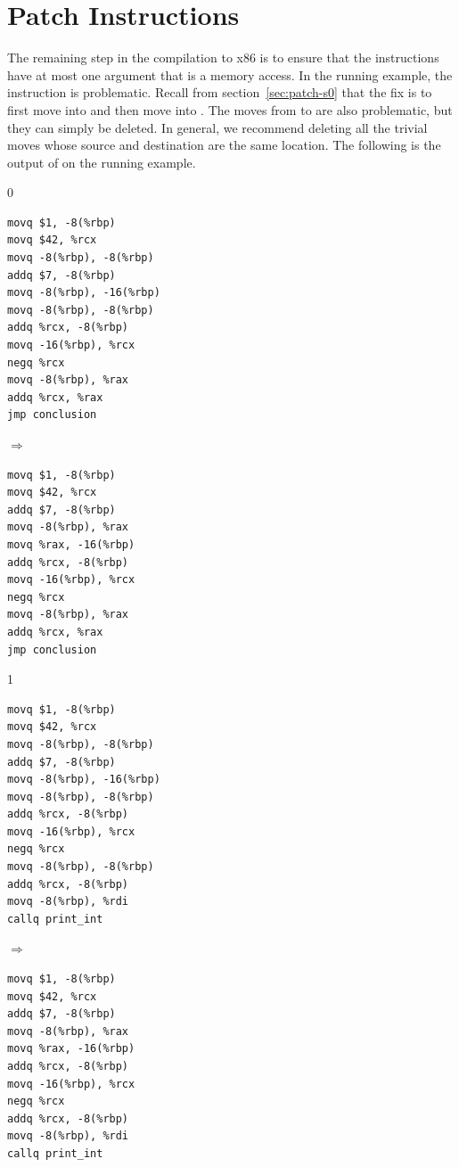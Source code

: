 \documentclass[7x10]{TimesAPriori_MIT}%
\def\racketEd{0}
\def\pythonEd{1}
\def\edition{0}
\numberwithin{theorem}{chapter}
\numberwithin{definition}{chapter}
\numberwithin{equation}{chapter}
\begin{document}
\section{Patch Instructions}
\label{sec:patch-instructions}

The remaining step in the compilation to x86 is to ensure that the
instructions have at most one argument that is a memory access.
%
In the running example, the instruction  is problematic. Recall from section~\ref{sec:patch-s0}
  that the fix is to first move  into  and
  then move  into .
%
The moves from  to  are also
problematic, but they can simply be deleted. In general, we recommend
deleting all the trivial moves whose source and destination are the
same location.
%
The following is the output of  on the
running example.
\begin{center}
{\if\edition\racketEd      
\begin{minipage}{0.4\textwidth}
\begin{lstlisting}
movq $1, -8(%rbp)
movq $42, %rcx
movq -8(%rbp), -8(%rbp)
addq $7, -8(%rbp)
movq -8(%rbp), -16(%rbp)
movq -8(%rbp), -8(%rbp)
addq %rcx, -8(%rbp)
movq -16(%rbp), %rcx
negq %rcx
movq -8(%rbp), %rax
addq %rcx, %rax
jmp conclusion
\end{lstlisting}
\end{minipage}
$\Rightarrow\qquad$
\begin{minipage}{0.45\textwidth}
\begin{lstlisting}
movq $1, -8(%rbp)
movq $42, %rcx
addq $7, -8(%rbp)
movq -8(%rbp), %rax
movq %rax, -16(%rbp)
addq %rcx, -8(%rbp)
movq -16(%rbp), %rcx
negq %rcx
movq -8(%rbp), %rax
addq %rcx, %rax
jmp conclusion
\end{lstlisting}
\end{minipage}
\fi}
{\if\edition\pythonEd
\begin{minipage}{0.4\textwidth}
\begin{lstlisting}
movq $1, -8(%rbp)
movq $42, %rcx
movq -8(%rbp), -8(%rbp)
addq $7, -8(%rbp)
movq -8(%rbp), -16(%rbp)
movq -8(%rbp), -8(%rbp)
addq %rcx, -8(%rbp)
movq -16(%rbp), %rcx
negq %rcx
movq -8(%rbp), -8(%rbp)
addq %rcx, -8(%rbp)
movq -8(%rbp), %rdi
callq print_int    
\end{lstlisting}
\end{minipage}
$\Rightarrow\qquad$
\begin{minipage}{0.45\textwidth}
\begin{lstlisting}
movq $1, -8(%rbp)
movq $42, %rcx
addq $7, -8(%rbp)
movq -8(%rbp), %rax
movq %rax, -16(%rbp)
addq %rcx, -8(%rbp)
movq -16(%rbp), %rcx
negq %rcx
addq %rcx, -8(%rbp)
movq -8(%rbp), %rdi
callq print_int    
\end{lstlisting}
\end{minipage}
\fi}
\end{center}
\end{document}
